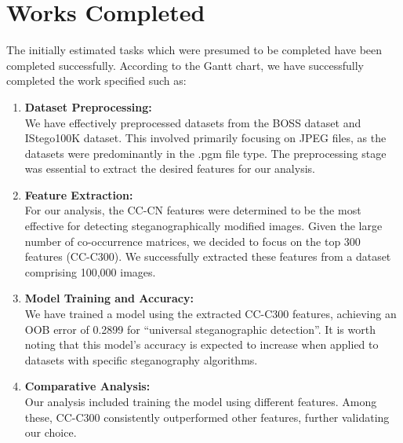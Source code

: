 \chapter{Works Completed}\sloppy

The initially estimated tasks which were presumed to be completed have been completed successfully. According to the Gantt chart, we have successfully completed the work specified such as:

\begin{enumerate}[label=\arabic*.]
    \item \textbf{Dataset Preprocessing:} \\
    We have effectively preprocessed datasets from the BOSS dataset and IStego100K dataset. This involved primarily focusing on JPEG files, as the datasets were predominantly in the .pgm file type. The preprocessing stage was essential to extract the desired features for our analysis.
    
    \item \textbf{Feature Extraction:} \\
    For our analysis, the CC-CN features were determined to be the most effective for detecting steganographically modified images. Given the large number of co-occurrence matrices, we decided to focus on the top 300 features (CC-C300). We successfully extracted these features from a dataset comprising 100,000 images.
    
    \item \textbf{Model Training and Accuracy:} \\
    We have trained a model using the extracted CC-C300 features, achieving an OOB error of 0.2899 for “universal steganographic detection”. It is worth noting that this model’s accuracy is expected to increase when applied to datasets with specific steganography algorithms.
    
    \item \textbf{Comparative Analysis:} \\
    Our analysis included training the model using different features. Among these, CC-C300 consistently outperformed other features, further validating our choice.
\end{enumerate}